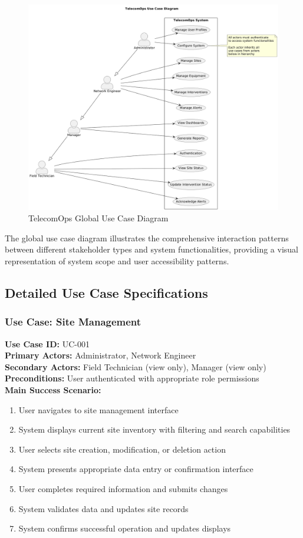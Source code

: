 \begin{figure}[H]
    \centering
    \includegraphics[width=0.95\linewidth]{img/chap_02/TelecomOps_UseCase_Diagram.png}
    \caption{TelecomOps Global Use Case Diagram}
    \label{fig:use_case_global}
\end{figure}

The global use case diagram illustrates the comprehensive interaction patterns between different stakeholder types and system functionalities, providing a visual representation of system scope and user accessibility patterns.

\subsection{Detailed Use Case Specifications}

\subsubsection{Use Case: Site Management}
\textbf{Use Case ID:} UC-001 \\
\textbf{Primary Actors:} Administrator, Network Engineer \\
\textbf{Secondary Actors:} Field Technician (view only), Manager (view only) \\
\textbf{Preconditions:} User authenticated with appropriate role permissions \\

\textbf{Main Success Scenario:}
\begin{enumerate}
\item User navigates to site management interface
\item System displays current site inventory with filtering and search capabilities
\item User selects site creation, modification, or deletion action
\item System presents appropriate data entry or confirmation interface
\item User completes required information and submits changes
\item System validates data and updates site records
\item System confirms successful operation and updates displays
\end{enumerate}

